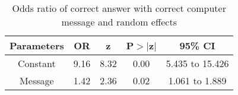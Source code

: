 \begin{table}[htbp]
\centering
\caption{Odds ratio of correct answer with correct computer message and random effects} 
\label{ormesgrecc}
\begin{tabular}{ccccc}
  \toprule
Parameters & OR & z & P$>$$|$z$|$ & 95\% CI \\ 
  \midrule
Constant & 9.16 & 8.32 & 0.00 & 5.435 to 15.426 \\ 
  Message & 1.42 & 2.36 & 0.02 & 1.061 to 1.889 \\ 
   \bottomrule
\end{tabular}
\end{table}
